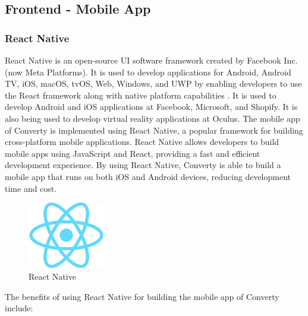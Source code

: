\subsection{Frontend - Mobile App}

\subsubsection{React Native}
React Native is an open-source UI software framework created by Facebook Inc. (now Meta Platforms). It is used to develop applications for Android, Android TV, iOS, macOS, tvOS, Web, Windows, and UWP by enabling developers to use the React framework along with native platform capabilities \cite{reactnative}. It is used to develop Android and iOS applications at Facebook, Microsoft, and Shopify. It is also being used to develop virtual reality applications at Oculus. The mobile app of Converty is implemented using React Native, a popular framework for building cross-platform mobile applications. React Native allows developers to build mobile apps using JavaScript and React, providing a fast and efficient development experience. By using React Native, Converty is able to build a mobile app that runs on both iOS and Android devices, reducing development time and cost.

\begin{figure}[H]
    \centering
    \includegraphics[width=0.3\textwidth]{Images/reactNative.png}
    \caption{React Native}
    \label{fig:reactNative}
\end{figure}

The benefits of using React Native for building the mobile app of Converty include:

